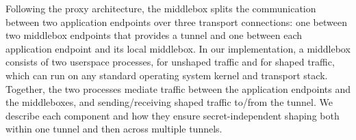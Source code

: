 %
Following the proxy architecture, the middlebox splits the communication between
two application endpoints over three transport connections:
one between two middlebox endpoints that provides a tunnel and one between
each application endpoint and its local middlebox.
In our implementation, a middlebox consists of two userspace processes,
{\ushaper} for unshaped traffic and {\dshaper} for shaped traffic,
which can run on any standard operating system kernel
and transport stack.
Together, the two processes mediate traffic between the application endpoints
and the middleboxes, and sending/receiving shaped traffic to/from the tunnel.
We describe each {\sys} component and
how they ensure secret-independent shaping
both within one tunnel and then across multiple tunnels.

\subsection{}


